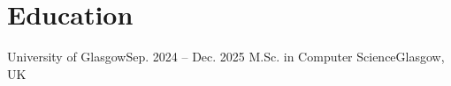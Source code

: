 \section{Education}
\resumeSubHeadingListStart
\resumeSubheading
{University of Glasgow}{Sep. 2024 -- Dec. 2025}
{M.Sc. in Computer Science}{Glasgow, UK}
\resumeSubHeadingListEnd
